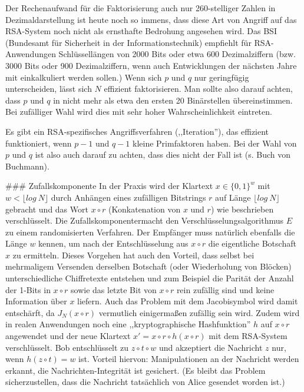 \documentclass[a4paper]{article}
\begin{document}
\begin{multicols}{3}
{{{{Der Rechenaufwand für die Faktorisierung auch nur 260-stelliger Zahlen in Dezimaldarstellung ist heute noch so immens, dass diese Art von Angriff auf das RSA-System noch nicht als ernsthafte Bedrohung angesehen wird. Das BSI (Bundesamt für Sicherheit in der Informationstechnik) empfiehlt für RSA-Anwendungen Schlüssellängen von 2000 Bits oder etwa 600 Dezimalziffern (bzw. 3000 Bits oder 900 Dezimalziffern, wenn auch Entwicklungen der nächsten Jahre mit einkalkuliert werden sollen.)
Wenn sich $p$ und $q$ nur geringfügig unterscheiden, lässt sich $N$ effizient faktorisieren. Man sollte also darauf achten, dass $p$ und $q$ in nicht mehr als etwa den ersten 20 Binärstellen übereinstimmen. Bei zufälliger Wahl wird dies mit sehr hoher Wahrscheinlichkeit eintreten.

Es gibt ein RSA-spezifisches Angriffsverfahren (,,Iteration''), das effizient funktioniert, wenn $p-1$ und $q-1$ kleine Primfaktoren haben. Bei der Wahl von $p$ und $q$ ist also auch darauf zu achten, dass dies nicht der Fall ist (s. Buch von Buchmann).

### Zufallskomponente
In der Praxis wird der Klartext $x\in\{0,1\}^w$ mit $w<\lfloor log\ N\rfloor$ durch Anhängen eines zufälligen Bitstrings $r$ auf Länge $\lfloor log\ N\rfloor$ gebracht und das Wort $x\circ r$ (Konkatenation von $x$ und $r$) wie beschrieben verschlüsselt. Die Zufallskomponentermacht den Verschlüsselungsalgorithmus $E$ zu einem randomisierten Verfahren. Der Empfänger muss natürlich ebenfalls die Länge $w$ kennen, um nach der Entschlüsselung aus $x\circ r$ die eigentliche Botschaft $x$ zu ermitteln. Dieses Vorgehen hat auch den Vorteil, dass selbst bei mehrmaligem Versenden derselben Botschaft (oder Wiederholung von Blöcken) unterschiedliche Chiffretexte entstehen und zum Beispiel die Parität der Anzahl der 1-Bits in $x\circ r$ sowie das letzte Bit von $x\circ r$ rein zufällig sind und keine Information über $x$ liefern. Auch das Problem mit dem Jacobisymbol wird damit entschärft, da $J_N(x\circ r)$ vermutlich einigermaßen zufällig sein wird. Zudem wird in realen Anwendungen noch eine ,,kryptographische Hashfunktion'' $h$ auf $x\circ r$ angewendet und der neue Klartext $x′=x\circ r\circ h(x\circ r)$ mit dem RSA-System verschlüsselt. Bob entschlüsselt zu $z\circ t\circ w$ und akzeptiert die Nachricht $z$ nur, wenn $h(z\circ t)=w$ ist. Vorteil hiervon: Manipulationen an der Nachricht werden erkannt, die Nachrichten-Integrität
ist gesichert. (Es bleibt das Problem sicherzustellen, dass die Nachricht tatsächlich von Alice gesendet worden ist.)

}}}}
\end{multicols}
\end{document}
